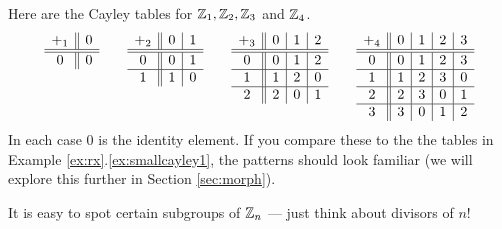 \begin{examples}{}{}
	Here are the Cayley tables for $\mathbb{Z}_1,\mathbb{Z}_2,\mathbb{Z}_3$ and $\mathbb{Z}_4$.
	\[
		\begin{array}[t]{c||c}
			+_1 & 0\\\hline\hline
			0 & 0
		\end{array}
		\qquad
		\begin{array}[t]{c||c|c}
			+_2 & 0 & 1\\\hline\hline
			0 & 0 & 1\\\hline
			1 & 1 & 0
		\end{array}
		\qquad
		\begin{array}[t]{c||c|c|c}
			+_3 & 0 & 1 & 2\\\hline\hline
			0 & 0 & 1 & 2\\\hline
			1 & 1 & 2 & 0\\\hline
			2 & 2 & 0 & 1
		\end{array}
		\qquad
		\begin{array}[t]{c||c|c|c|c}
			+_4 & 0 & 1 & 2 & 3\\\hline\hline
			0 & 0 & 1 & 2 & 3\\\hline
			1 & 1 & 2 & 3 & 0\\\hline
			2 & 2 & 3 & 0 & 1\\\hline
			3 & 3 & 0 & 1 & 2
		\end{array}
	\]
	In each case 0 is the identity element. If you compare these to the the tables in  Example \ref*{ex:rx}.\ref{ex:smallcayley1}, the patterns should look familiar (we will explore this further in Section \ref{sec:morph}).
\end{examples}


It is easy to spot certain subgroups of $\mathbb{Z}_n$ --- just think about divisors of $n$!

